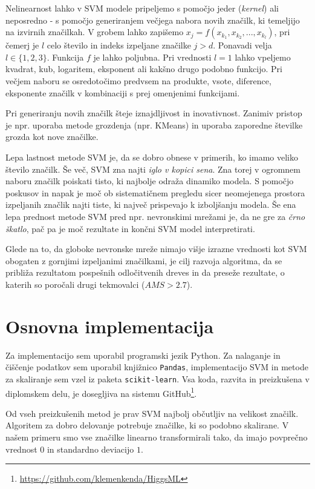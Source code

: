 \documentclass[11pt,a4paper,openany]{book}
\begin{document}
Nelinearnost lahko v SVM modele pripeljemo s pomočjo jeder (\textit{kernel}) ali neposredno - s pomočjo generiranjem večjega nabora novih značilk, ki temeljijo na izvirnih značilkah. V grobem lahko zapišemo $x_j = f(x_{k_1}, x_{k_2}, ..., x_{k_l})$, pri čemerj je $l$ celo število in indeks izpeljane značilke $j > d$. Ponavadi velja $l \in \{1, 2, 3\}$. Funkcija $f$ je lahko poljubna. Pri vrednosti $l = 1$ lahko vpeljemo kvadrat, kub, logaritem, eksponent ali kakšno drugo podobno funkcijo. Pri večjem naboru se osredotočimo predvsem na produkte, vsote, diference, eksponente značilk v kombinaciji s prej omenjenimi funkcijami. 

Pri generiranju novih značilk šteje iznajdljivost in inovativnost. Zanimiv pristop je npr. uporaba metode grozdenja (npr. KMeans) in uporaba zaporedne številke grozda kot nove značilke.

Lepa lastnost metode SVM je, da se dobro obnese v primerih, ko imamo veliko število značilk. Še več, SVM zna najti \textit{iglo v kopici sena}. Zna torej v ogromnem naboru značilk poiskati tisto, ki najbolje odraža dinamiko modela. S pomočjo poskusov in napak je moč ob sistematičnem pregledu sicer neomejenega prostora izpeljanih značlik najti tiste, ki največ prispevajo k izboljšanju modela. Še ena lepa prednost metode SVM pred npr. nevronskimi mrežami je, da ne gre za \textit{črno škatlo}, pač pa je moč rezultate in končni SVM model interpretirati.

Glede na to, da globoke nevronske mreže nimajo višje izrazne vrednosti kot SVM obogaten z gornjimi izpeljanimi značilkami, je cilj razvoja algoritma, da se približa rezultatom pospešnih odločitvenih dreves in da preseže rezultate, o katerih so poročali drugi tekmovalci ($AMS > 2.7$).


\section{Osnovna implementacija}
Za implementacijo sem uporabil programski jezik Python. Za nalaganje in čiščenje podatkov sem uporabil knjižnico \texttt{Pandas}, implementacijo SVM in metode za skaliranje sem vzel iz paketa \texttt{scikit-learn}\cite{scikit-learn}. Vsa koda, razvita in preizkušena v diplomskem delu, je dosegljiva na sistemu GitHub\footnote{\url{https://github.com/klemenkenda/HiggsML}}.

Od vseh preizkušenih metod je prav SVM najbolj občutljiv na velikost značilk. Algoritem za dobro delovanje potrebuje značilke, ki so podobno skalirane. V našem primeru smo vse značilke linearno transformirali tako, da imajo povprečno vrednost $0$ in standardno deviacijo $1$.
\end{document}
